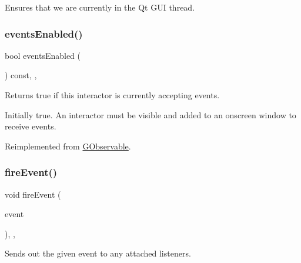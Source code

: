 Ensures that we are currently in the Qt G\+UI thread. 

\mbox{\label{classsgl_1_1GInteractor_a597a370b592e3737d38d9d2f4e2031ea}} 
\subsubsection{\texorpdfstring{events\+Enabled()}{eventsEnabled()}}
{\footnotesize\ttfamily bool events\+Enabled (\begin{DoxyParamCaption}{ }\end{DoxyParamCaption}) const\hspace{0.3cm}{\ttfamily [override]}, {\ttfamily [virtual]}, {\ttfamily [inherited]}}



Returns true if this interactor is currently accepting events. 

Initially true. An interactor must be visible and added to an onscreen window to receive events. 

Reimplemented from \mbox{\hyperlink{classsgl_1_1GObservable_a8ebb3da91032e7f4c34485dabc518b8a}{G\+Observable}}.

\mbox{\label{classsgl_1_1GObservable_a63e5e5a6227c59c928493b11aceb0f67}} 
\subsubsection{\texorpdfstring{fire\+Event()}{fireEvent()}}
{\footnotesize\ttfamily void fire\+Event (\begin{DoxyParamCaption}\item[{\mbox{\hyperlink{classsgl_1_1GEvent}{G\+Event}} \&}]{event }\end{DoxyParamCaption})\hspace{0.3cm}{\ttfamily [protected]}, {\ttfamily [virtual]}, {\ttfamily [inherited]}}



Sends out the given event to any attached listeners. 

\mbox{\label{classsgl_1_1GObservable_ab3983ea07337b52020a29cc00c653d8d}} 
